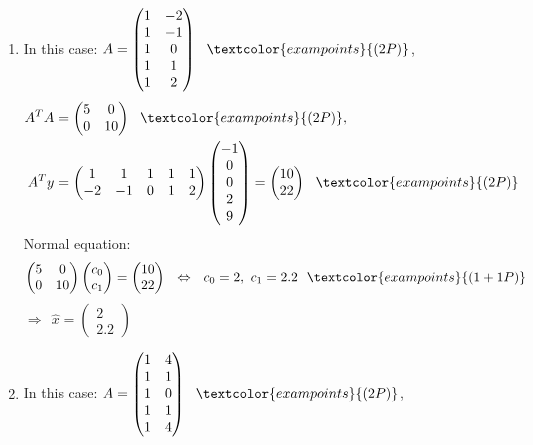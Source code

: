 {\color{solution}
\begin{enumerate}
	\item In this case: $A=\begin{pmatrix}1&-2\\1&-1\\1&0\\1&1\\1&2\end{pmatrix}~~\textcolor{exampoints}{(2P)}$,
	\begin{align*}
	A^TA&=\begin{pmatrix}5&0\\0&10\end{pmatrix}~~\textcolor{exampoints}{(2P)},\\
	A^Ty&=\begin{pmatrix}1&1&1&1&1\\-2&-1&0&1&2\end{pmatrix}
	\begin{pmatrix}-1\\0\\0\\2\\9\end{pmatrix}
	=\begin{pmatrix}10\\22\end{pmatrix}~~\textcolor{exampoints}{(2P)}
	\end{align*}
	Normal equation: 
	$$\begin{pmatrix}5&0\\0&10\end{pmatrix}\begin{pmatrix}c_0\\c_1\end{pmatrix}
	=\begin{pmatrix}10\\22\end{pmatrix}~~\Leftrightarrow~~c_0=2,~c_1=2.2~~\textcolor{exampoints}{(1+1P)}$$
	$\Rightarrow~~\hat{x}=\begin{pmatrix}2\\2.2\end{pmatrix}$
		\item In this case: $A=
	\begin{pmatrix}
	1&4\\
	1&1\\
	1&0\\
	1&1\\
	1&4
	\end{pmatrix}~~\textcolor{exampoints}{(2P)}$,

\end{enumerate}}
